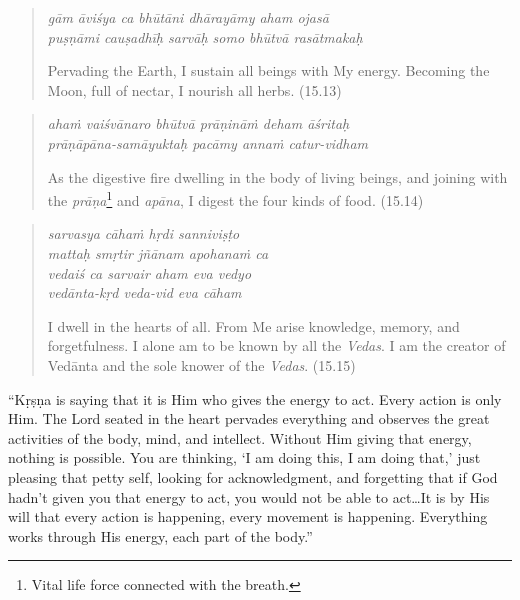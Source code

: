 \documentclass[12pt, twoside, openright]{memoir}
\begin{document}
\par
\begin{verse}
\textit{gām āviśya ca bhūtāni dhārayāmy aham ojasā} \\
\textit{puṣṇāmi cauṣadhīḥ sarvāḥ somo bhūtvā rasātmakaḥ}

\noindent Pervading the Earth, I sustain all beings with My energy. Becoming the Moon, full of nectar, I nourish all herbs. (15.13)
\end{verse}
\par



\par
\begin{verse}
\textit{ahaṁ vaiśvānaro bhūtvā prāṇināṁ deham āśritaḥ} \\
\textit{prāṇāpāna-samāyuktaḥ pacāmy annaṁ catur-vidham}

\noindent As the digestive fire dwelling in the body of living beings, and joining with the \textit{prāṇa}\footnote{Vital life force connected with the breath.} and \textit{apāna}, I digest the four kinds of food. (15.14)
\end{verse}
\par



\par
\begin{verse}
\textit{sarvasya cāhaṁ hṛdi sanniviṣṭo} \\
\textit{mattaḥ smṛtir jñānam apohanaṁ ca} \\
\textit{vedaiś ca sarvair aham eva vedyo} \\
\textit{vedānta-kṛd veda-vid eva cāham}

\noindent I dwell in the hearts of all. From Me arise knowledge, memory, and forgetfulness. I alone am to be known by all the \textit{Vedas}. I am the creator of Vedānta and the sole knower of the \textit{Vedas}. (15.15)
\end{verse}
\par


\enquote{Kṛṣṇa is saying that it is Him who gives the energy to act. Every action is only Him. The Lord seated in the heart pervades everything and observes the great activities of the body, mind, and intellect. Without Him giving that energy, nothing is possible. You are thinking, \enquote{I am doing this, I am doing that,} just pleasing that petty self, looking for acknowledgment, and forgetting that if God hadn’t given you that energy to act, you would not be able to act\ldots It is by His will that every action is happening, every movement is happening. Everything works through His energy, each part of the body.}
\end{document}
